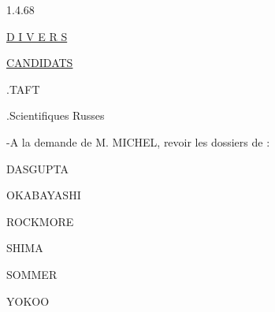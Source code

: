 \begin{flushright}1.4.68\end{flushright}

\uline{D I V E R S}

\uline{CANDIDATS}

.\quad TAFT

.\quad Scientifiques Russes

-\quad A la demande de M. MICHEL, revoir les dossiers de :

DASGUPTA

OKABAYASHI

ROCKMORE

SHIMA

SOMMER

YOKOO

